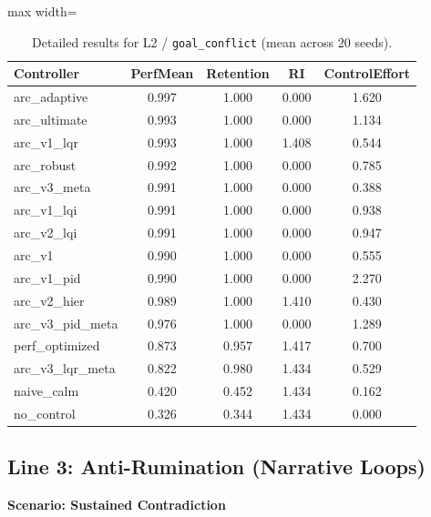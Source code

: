 \documentclass{article}
\newcommand{\scenarioheader}[1]{\Needspace{20\baselineskip}\textbf{Scenario: #1}}
\begin{document}
\begin{table}[H]
\centering
\footnotesize
\caption{Detailed results for L2 / \texttt{goal\_conflict} (mean across 20 seeds).}
\label{tab:g5_goal_conflict}
\begin{adjustbox}{max width=\textwidth}
\begin{tabular}{@{}lcccc@{}}
\toprule
Controller & PerfMean & Retention & RI & ControlEffort \\ \midrule
arc\_adaptive & 0.997 & 1.000 & 0.000 & 1.620 \\
arc\_ultimate & 0.993 & 1.000 & 0.000 & 1.134 \\
arc\_v1\_lqr & 0.993 & 1.000 & 1.408 & 0.544 \\
arc\_robust & 0.992 & 1.000 & 0.000 & 0.785 \\
arc\_v3\_meta & 0.991 & 1.000 & 0.000 & 0.388 \\
arc\_v1\_lqi & 0.991 & 1.000 & 0.000 & 0.938 \\
arc\_v2\_lqi & 0.991 & 1.000 & 0.000 & 0.947 \\
arc\_v1 & 0.990 & 1.000 & 0.000 & 0.555 \\
arc\_v1\_pid & 0.990 & 1.000 & 0.000 & 2.270 \\
arc\_v2\_hier & 0.989 & 1.000 & 1.410 & 0.430 \\
arc\_v3\_pid\_meta & 0.976 & 1.000 & 0.000 & 1.289 \\
perf\_optimized & 0.873 & 0.957 & 1.417 & 0.700 \\
arc\_v3\_lqr\_meta & 0.822 & 0.980 & 1.434 & 0.529 \\
naive\_calm & 0.420 & 0.452 & 1.434 & 0.162 \\
no\_control & 0.326 & 0.344 & 1.434 & 0.000 \\ \bottomrule
\end{tabular}
\end{adjustbox}
\end{table}

\FloatBarrier
\subsection{Line 3: Anti-Rumination (Narrative Loops)}

\scenarioheader{Sustained Contradiction}
\end{document}
